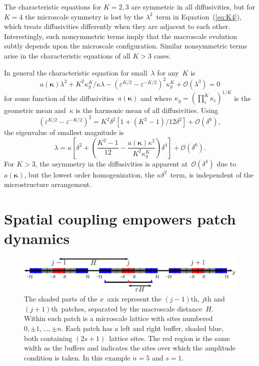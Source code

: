 \documentclass[12pt,a4paper]{article}
\begin{document}
The characteristic equations for $K=2,3$ are symmetric in all diffusivities, but for $K=4$ the microscale symmetry is lost by the $\lambda^2$~term in Equation~(\ref{eq:K4}), which treats diffusivities differently when they are adjacent to each other.
Interestingly, such nonsymmetric terms imply that the macroscale evolution subtly depends upon the microscale configuration. Similar nonsymmetric terms arise in the characteristic equations of all $K>3$ cases.

In general the characteristic equation for small~$\lambda$ for any~$K$ is
\begin{equation}
a({\bm \kappa})\lambda^2+K^2\kappa_g^K/\kappa\lambda-(\varepsilon^{K/2}-\varepsilon^{-K/2})^2\kappa_g^K+\mathcal O(\lambda^3)=0
\end{equation}
for some function of the diffusivities~$a({\bm \kappa})$ and where $\kappa_g=(\prod_i^K\kappa_i)^{1/K}$ is the geometric mean and~$\kappa$ is the harmonic mean of all diffusivities. 
Using
\begin{equation}
(\varepsilon^{K/2}-\varepsilon^{-K/2})^2=K^2\delta^2[1+(K^2-1)/12\delta^2]+\mathcal O(\delta^6),
\end{equation}
the eigenvalue of smallest magnitude is
\begin{equation}
\lambda=\kappa\left[\delta^2+\left(\frac{K^2-1}{12}-\frac{a({\bm \kappa})\kappa^2}{K^2\kappa_g^K}\right)\delta^4\right]+\mathcal O(\delta^6).\label{eq:glargek}
\end{equation}
For $K>3$, the asymmetry in the diffusivities is apparent at~$\mathcal O(\delta^4)$ due to~$a({\bm \kappa})$, but the lowest order homogenization, the $\kappa\delta^2$~term, is independent of the microstructure arrangement.

\section{Spatial coupling empowers patch dynamics}
\label{sec:numerical}


\begin{figure}
\centering
\includegraphics[width=13cm]{1dBC}
\caption{The shaded parts of the $x$~axis represent the $(j-1)$th, $j$th and $(j+1)$th~patches, separated by the macroscale distance~$H$. Within each patch is a microscale lattice with sites numbered $0,\pm1,\ldots,\pm n$. Each patch has a left and right buffer, shaded blue, both containing $(2s+1)$~lattice sites. The red region is the same width as the buffers and indicates the sites over which the amplitude condition is taken. In this example $n=5$ and $s=1$.}
\label{fig:1dBC}
\end{figure}
\end{document}
